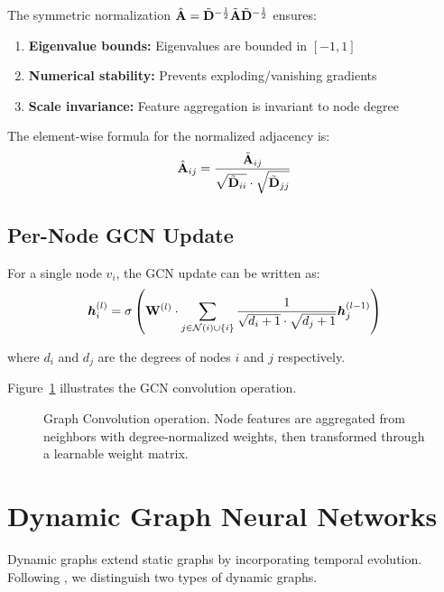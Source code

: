 The symmetric normalization $\hat{\mathbf{A}} = \tilde{\mathbf{D}}^{-\frac{1}{2}} \tilde{\mathbf{A}} \tilde{\mathbf{D}}^{-\frac{1}{2}}$ ensures:

\begin{enumerate}
    \item \textbf{Eigenvalue bounds:} Eigenvalues are bounded in $[-1, 1]$
    \item \textbf{Numerical stability:} Prevents exploding/vanishing gradients
    \item \textbf{Scale invariance:} Feature aggregation is invariant to node degree
\end{enumerate}

The element-wise formula for the normalized adjacency is:
\begin{equation}
    \hat{\mathbf{A}}_{ij} = \frac{\tilde{\mathbf{A}}_{ij}}{\sqrt{\tilde{\mathbf{D}}_{ii}} \cdot \sqrt{\tilde{\mathbf{D}}_{jj}}}
\end{equation}

\subsection{Per-Node GCN Update}

For a single node $v_i$, the GCN update can be written as:
\begin{equation}
    \bm{h}_i^{(l)} = \sigma\left(\mathbf{W}^{(l)} \cdot \sum_{j \in \mathcal{N}(i) \cup \{i\}} \frac{1}{\sqrt{d_i + 1} \cdot \sqrt{d_j + 1}} \bm{h}_j^{(l-1)}\right)
\end{equation}

where $d_i$ and $d_j$ are the degrees of nodes $i$ and $j$ respectively.

Figure~\ref{fig:gcn_operation} illustrates the GCN convolution operation.

\begin{figure}[H]
    \centering
    
    \caption{Graph Convolution operation. Node features are aggregated from neighbors with degree-normalized weights, then transformed through a learnable weight matrix.}
    \label{fig:gcn_operation}
\end{figure}

\section{Dynamic Graph Neural Networks}

Dynamic graphs extend static graphs by incorporating temporal evolution. Following \cite{kazemi2020}, we distinguish two types of dynamic graphs.


